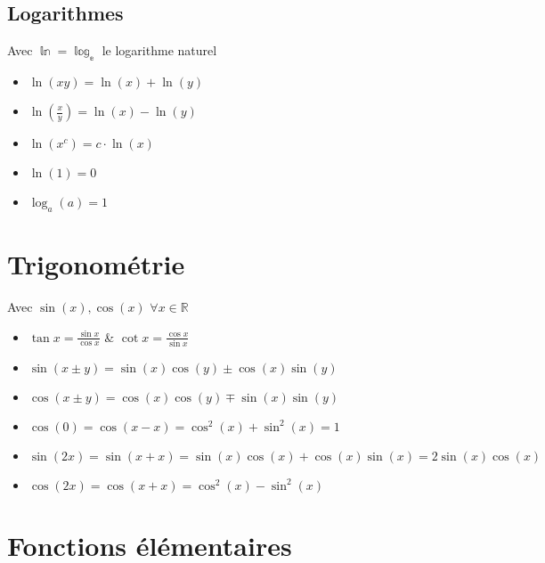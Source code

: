 \documentclass[10pt,a4paper]{book}
\newcommand{\R}{\mathbb{R}}
\begin{document}
\subsection{Logarithmes}

Avec $\mathbb{\ln = \log_e}$ le logarithme naturel
\begin{itemize}
\item $\ln(xy) = \ln(x) + \ln(y)$
\item $\ln(\frac{x}{y}) = \ln(x) - \ln(y)$
\item $\ln(x^c) = c\cdot \ln(x)$
\item $\ln(1) = 0$
\item $\log_a(a) = 1$
\end{itemize}

\section{Trigonométrie}

Avec $\sin(x), \cos(x)$  $\forall x \in \R$
\begin{itemize}
\item $\tan x = \frac{\sin x}{\cos x}$ \& $\cot x = \frac{\cos x}{\sin x}$
\item $\sin(x\pm y) = \sin(x)\cos(y) \pm \cos(x)\sin(y)$
\item $\cos(x \pm y) = \cos(x)\cos(y) \mp \sin(x)\sin(y)$
\item $\cos(0) = \cos(x-x) = \cos^2(x) + \sin^2(x) = 1$
\item $\sin(2x) = \sin(x+x) = \sin(x)\cos(x) + \cos(x)\sin(x) = 2\sin(x)\cos(x)$
\item $\cos(2x) = \cos(x+x) = \cos^2(x) - \sin^2(x)$
\end{itemize}

\section{Fonctions élémentaires}
\end{document}
